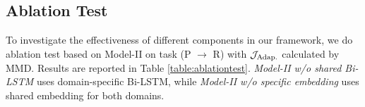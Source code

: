 

\subsection{Ablation Test}

To investigate the effectiveness of different components in our framework, we do ablation test based on Model-\RN{2} on task (P $\rightarrow$ R) with $\mathcal{J}_\textnormal{Adap.}$ calculated by MMD. Results are reported in Table \ref{table:ablationtest}. \textit{Model-\RN{2} w/o shared Bi-LSTM} uses domain-specific Bi-LSTM, while \textit{Model-\RN{2} w/o specific embedding} uses shared embedding for both domains. 

